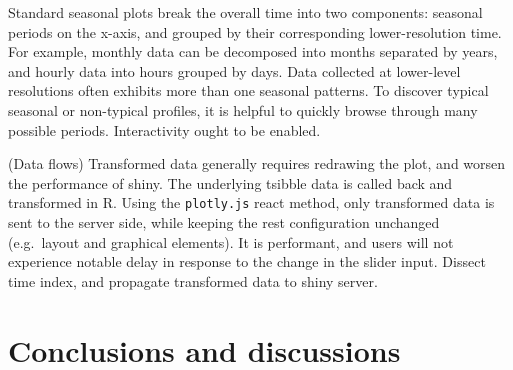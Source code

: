 Standard seasonal plots break the overall time into two components:
seasonal periods on the x-axis, and grouped by their corresponding
lower-resolution time. For example, monthly data can be decomposed into
months separated by years, and hourly data into hours grouped by days.
Data collected at lower-level resolutions often exhibits more than one
seasonal patterns. To discover typical seasonal or non-typical profiles,
it is helpful to quickly browse through many possible periods.
Interactivity ought to be enabled.

(Data flows) Transformed data generally requires redrawing the plot, and
worsen the performance of shiny. The underlying tsibble data is called
back and transformed in R. Using the \texttt{plotly.js} react method,
only transformed data is sent to the server side, while keeping the rest
configuration unchanged (e.g.~layout and graphical elements). It is
performant, and users will not experience notable delay in response to
the change in the slider input. Dissect time index, and propagate
transformed data to shiny server.

\hypertarget{conclusions-and-discussions}{%
\section{Conclusions and
discussions}\label{conclusions-and-discussions}}



\address{%
Earo Wang\\
The University of Auckland\\%
Department of Statistics\\ The University of Auckland\\ New Zealand\\
%
%
%
\\\href{mailto:earo.wang@auckland.ac.nz}{\nolinkurl{earo.wang@auckland.ac.nz}}
}

\address{%
Dianne Cook\\
Monash University\\%
Department of Econometrics and Business Statistics\\ Monash
University\\ Australia\\
%
%
%
\\\href{mailto:dicook@monash.edu}{\nolinkurl{dicook@monash.edu}}
}
